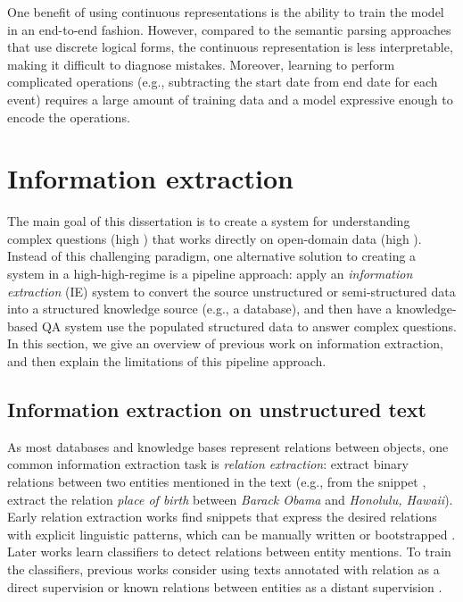 One benefit of using continuous representations
is the ability to train the model in an end-to-end fashion.
However, compared to the semantic parsing approaches
that use discrete logical forms,
the continuous representation is less interpretable,
making it difficult to diagnose mistakes.
Moreover, learning to perform complicated operations
(e.g., subtracting the start date from end date for each event)
requires a large amount of training data and
a model expressive enough
to encode the operations.


\section{Information extraction}
\label{sec:rw-ie}

The main goal of this dissertation is to create a system
for understanding complex questions (high \Depth)
that works directly on open-domain data (high \Breadth).
Instead of this challenging paradigm,
one alternative solution to creating a system in
a high-\Breadth high-\Depth regime is a pipeline approach:
apply an \emph{information extraction} (IE) system to
convert the source unstructured or semi-structured data into a
structured knowledge source (e.g., a database),
and then have a knowledge-based QA system
use the populated structured data to answer complex questions.
In this section,
we give an overview of previous work on information extraction,
and then explain the limitations of this pipeline approach.

\subsection{Information extraction on unstructured text}

As most databases and knowledge bases represent relations between objects,
one common information extraction task is \emph{relation extraction}:
extract binary relations between two entities mentioned
in the text
(e.g., from the snippet
,
extract the relation \emph{place of birth}
between \emph{Barack Obama} and \emph{Honolulu, Hawaii}).
Early relation extraction works find snippets that express
the desired relations with explicit
linguistic patterns, which can be manually written or bootstrapped
\cite{hearst1992automatic,hearst1998automated,agichtein2000snowball}.
Later works learn classifiers to detect relations between entity mentions.
To train the classifiers, previous works consider using
texts annotated with relation as a direct supervision
\cite{zeng2014relation,miwa2016end}
or known relations between entities as a distant supervision
\cite{mintz2009distant,riedel2010modeling}.

